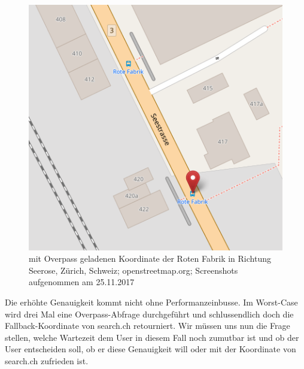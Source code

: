 \begin{figure}[ht]
    \centering
    \includegraphics[width=0.5\linewidth]{projectdoc/img/one_coordinate_for_two_stops_improved}
    \caption[mit Overpass geladenen Koordinate]{mit Overpass geladenen Koordinate der Roten Fabrik in Richtung Seerose, Zürich, Schweiz; openstreetmap.org; Screenshots aufgenommen am 25.11.2017}
    \label{fig:one_coordinate_for_two_stops_improved}
\end{figure}


Die erhöhte Genauigkeit kommt nicht ohne Performanzeinbusse. Im Worst-Case wird drei Mal eine Overpass-Abfrage \cite{wiki:overpass} durchgeführt und schlussendlich doch die Fallback-Koordinate von search.ch \cite{search_ch_route_api} retourniert. Wir müssen uns nun die Frage stellen, welche Wartezeit dem User in diesem Fall noch zumutbar ist und ob der User entscheiden soll, ob er diese Genauigkeit will oder mit der Koordinate von search.ch \cite{search_ch_route_api} zufrieden ist.

